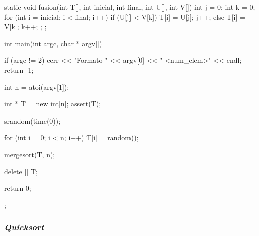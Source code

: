 \documentclass[12pt,spanish]{article}
\begin{document}
\begin{multicols}{2}
\begin{tcblisting}
static void fusion(int T[], int inicial, int final, int U[], int V[])
{
  int j = 0;
  int k = 0;
  for (int i = inicial; i < final; i++)
    {
      if (U[j] < V[k]) {
	T[i] = U[j];
	j++;
      } else{
	T[i] = V[k];
	k++;
      };
    };
}

int main(int argc, char * argv[])
{

  if (argc != 2)
    {
      cerr << "Formato " << argv[0] << " <num_elem>" << endl;
      return -1;
    }

  int n = atoi(argv[1]);

  int * T = new int[n];
  assert(T);

  srandom(time(0));

  for (int i = 0; i < n; i++)
    {
      T[i] = random();
    }
      
  mergesort(T, n);
  
  delete [] T;

  return 0;
};
 
\end{tcblisting}
\end{multicols}
\newpage
\subsubsection{\textit{Quicksort}}
\end{document}
